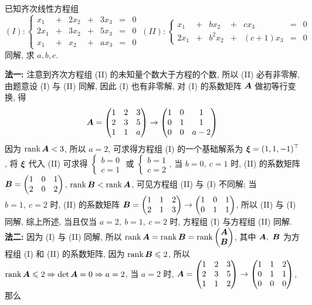 \begin{example}[2015 华南理工大学]
    已知齐次线性方程组
    $$(I):\left\{\begin{matrix}
            x_1  & + & 2x_2 & + & 3x_3 & = & 0 \\
            2x_1 & + & 3x_2 & + & 5x_3 & = & 0 \\
            x_1  & + & x_2  & + & ax_3 & = & 0
        \end{matrix}\right.~ (II):\left\{\begin{matrix}
            x_1  & + & bx_2   & + & cx_3     & = & 0 \\
            2x_1 & + & b^2x_2 & + & (c+1)x_3 & = & 0
        \end{matrix}\right.$$同解, 求 $a,b,c$.
\end{example}
\begin{solution}
    \textbf{法一: }注意到齐次方程组 (II) 的未知量个数大于方程的个数, 所以 (II) 必有非零解, 由题意设 (I) 与 (II) 同解, 
    因此 (I) 也有非零解, 对 (I) 的系数矩阵 $\vb*{A}$ 做初等行变换, 得
    $$\vb*{A}=\mqty(1&2&3\\2&3&5\\1&1&a)\to\mqty(1&0&1\\0&1&1\\0&0&a-2)$$
    因为 $\rank\vb*{A}<3$, 所以 $a=2$, 可求得方程组 (I) 的一个基础解系为 $\vb*{\xi}=(1,1,-1)^\top$, 
    将 $\vb*{\xi}$ 代入 (II) 可求得 $\begin{cases}
            b=0 \\c=1
        \end{cases}$ 或 $\begin{cases}
            b=1 \\c=2
        \end{cases}$, 当 $b=0,~c=1$ 时, (II) 的系数矩阵 $\vb*{B}=\mqty(1&0&1\\2&0&2)$, $\rank\vb*{B}<\rank\vb*{A}$, 
    可见方程组 (II) 与 (I) 不同解;
    当 $b=1,~c=2$ 时, (II) 的系数矩阵 $\vb*{B}=\mqty(1&1&2\\2&1&3)\to\mqty(1&0&1\\0&1&1)$, 所以 (II) 与 (I) 同解, 
    综上所述, 当且仅当 $a=2,~b=1,~c=2$ 时, 方程组 (I) 与方程组 (II) 同解.\\
    \textbf{法二: }因为 (I) 与 (II) 同解, 所以 $\rank\vb*{A}=\rank\vb*{B}=\rank\mqty(\vb*{A}\\\vb*{B})$, 其中 $\vb*{A},~\vb*{B}$ 为方程组 (I) 和 (II) 的系数矩阵, 
    因为 $\rank\vb*{B}\leqslant 2$, 所以 $\rank\vb*{A}\leqslant 2\Rightarrow \det\vb*{A}=0\Rightarrow a=2$, 当 $a=2$ 时, $\vb*{A}=\mqty(1&2&3\\2&3&5\\1&1&2)\to\mqty(1&1&2\\0&1&1\\0&0&0)$, 那么

\end{solution}
